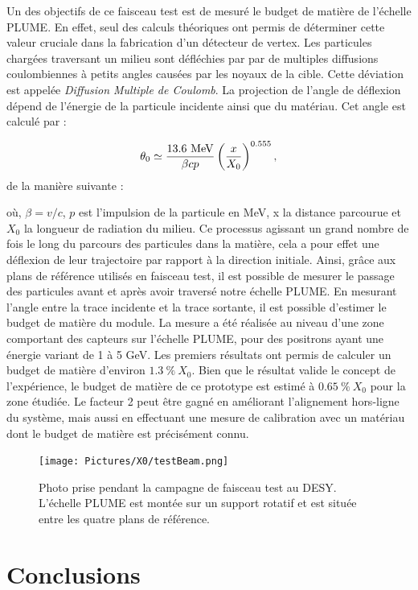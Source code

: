   Un des objectifs de ce faisceau test est de mesuré le budget de matière de l'échelle PLUME.
  En effet, seul des calculs théoriques ont permis de déterminer cette valeur cruciale dans la fabrication d'un détecteur de vertex.
  Les particules chargées traversant un milieu sont défléchies par par de multiples diffusions coulombiennes à petits angles causées par les noyaux de la cible.
  Cette déviation est appelée \textit{Diffusion Multiple de Coulomb}.
  La projection de l'angle de déflexion dépend de l'énergie de la particule incidente ainsi que du matériau.
  Cet angle est calculé par :

  \begin{equation}
    \theta_0 \simeq \frac{13.6~\rm{MeV}}{\beta c p} \left(\frac{x}{X_0}\right)^{0.555},
  \end{equation}de la manière suivante : 

  où, $\beta = v/c$, $p$ est l’impulsion de la particule en MeV, x la distance parcourue et $X_0$ la longueur de radiation du milieu.
  Ce processus agissant un grand nombre de fois le long du parcours des particules dans la matière, cela a pour effet une déflexion de leur trajectoire par rapport à la direction initiale.
  Ainsi, grâce aux plans de référence utilisés en faisceau test, il est possible de mesurer le passage des particules avant et après avoir traversé notre échelle PLUME.
  En mesurant l'angle entre la trace incidente et la trace sortante, il est possible d'estimer le budget de matière du module.
  La mesure a été réalisée au niveau d'une zone comportant des capteurs sur l'échelle PLUME, pour des positrons ayant une énergie variant de 1 à 5 GeV.
  Les premiers résultats ont permis de calculer un budget de matière d'environ $1.3~\%~X_0$.
  Bien que le résultat valide le concept de l'expérience, le budget de matière de ce prototype est estimé à $0.65~\%~X_0$ pour la zone étudiée.
  Le facteur 2 peut être gagné en améliorant l'alignement hors-ligne du système, mais aussi en effectuant une mesure de calibration avec un matériau dont le budget de matière est précisément connu.  

  \begin{figure}
    \centering
    \texttt{[image: Pictures/X0/testBeam.png]}
    \caption{Photo prise pendant la campagne de faisceau test au DESY. L'échelle PLUME est montée sur un support rotatif et est située entre les quatre plans de référence.}
    \label{fig:testBeam_resume}
  \end{figure}

  \section{Conclusions}
 
